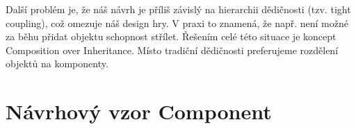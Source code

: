 Další problém je, že náš návrh je příliš závislý na hierarchii dědičnosti (tzv. tight coupling), což omezuje náš design hry. V praxi to znamená, že např. není možné za běhu přidat objektu schopnost střílet. Řešením celé této situace je koncept Composition over Inheritance. Místo tradiční dědičnosti preferujeme rozdělení objektů na komponenty.

\section{Návrhový vzor Component}







